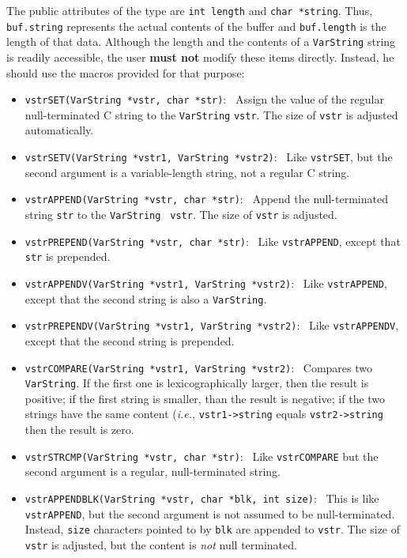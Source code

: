The public attributes of the type are {\tt int length} and {\tt char *string}.
Thus, {\tt buf.string} represents the actual contents of the buffer and
{\tt buf.length} is the length of that data. Although the length and the
contents of a {\tt VarString} string is readily accessible, the user {\bf must
not} modify these items directly. Instead, he should use the macros
provided for that purpose:
\begin{itemize}
  \item {\tt vstrSET(VarString *vstr, char *str)}:~
    Assign the value of the regular null-terminated C string to the
    {\tt VarString} {\tt vstr}. The size of {\tt vstr} is adjusted
    automatically.
  \item {\tt vstrSETV(VarString *vstr1, VarString *vstr2)}:~
    Like {\tt vstrSET}, but the second argument is a variable-length
    string, not a regular C string.
  \item {\tt vstrAPPEND(VarString *vstr, char *str)}:~
    Append the null-terminated string {\tt str} to the {\tt VarString} {\tt
      vstr}. The size of {\tt vstr} is adjusted.
  \item {\tt vstrPREPEND(VarString *vstr, char *str)}:~
    Like {\tt vstrAPPEND}, except that {\tt str} is prepended.
  \item {\tt vstrAPPENDV(VarString *vstr1, VarString *vstr2)}:~
    Like {\tt vstrAPPEND}, except that the second string is also a
    {\tt VarString}.
  \item {\tt vstrPREPENDV(VarString *vstr1, VarString *vstr2)}:~
    Like {\tt vstrAPPENDV}, except that the second string is prepended.
  \item {\tt vstrCOMPARE(VarString *vstr1, VarString *vstr2)}:~
    Compares two {\tt VarString}. If the first one is lexicographically
    larger, then the result is positive; if the first string is smaller,
    than the result is negative; if the two strings have the same content
    ({\it i.e.}, {\tt vstr1->string} equals {\tt vstr2->string} then the
    result is zero.
  \item {\tt vstrSTRCMP(VarString *vstr, char *str)}:~
    Like {\tt vstrCOMPARE} but the second argument is a regular,
    null-terminated string.
  \item {\tt vstrAPPENDBLK(VarString *vstr, char *blk, int size)}:~
    This is like {\tt vstrAPPEND}, but the second argument is not assumed
    to be null-terminated. Instead, {\tt size} characters pointed to by
    {\tt blk} are appended to {\tt vstr}. The size of {\tt vstr} is
    adjusted, but the content is \emph{not} null terminated.

\end{itemize}
